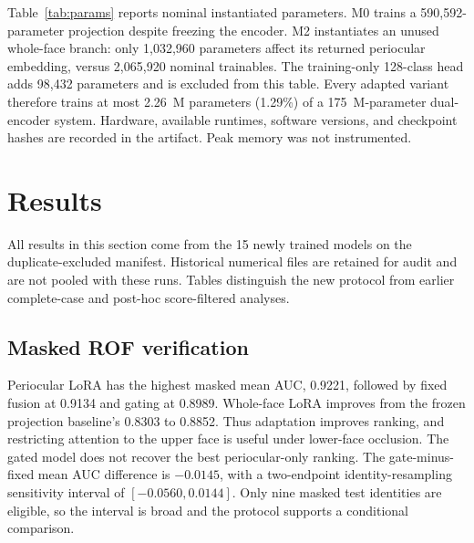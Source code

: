 \documentclass[12pt,a4paper,oneside]{report}
\begin{document}
Table~\ref{tab:params} reports nominal instantiated parameters. M0 trains a 590,592-parameter projection despite freezing the encoder. M2 instantiates an unused whole-face branch: only 1,032,960 parameters affect its returned periocular embedding, versus 2,065,920 nominal trainables. The training-only 128-class head adds 98,432 parameters and is excluded from this table. Every adapted variant therefore trains at most 2.26~M parameters (1.29\%) of a 175~M-parameter dual-encoder system. Hardware, available runtimes, software versions, and checkpoint hashes are recorded in the artifact. Peak memory was not instrumented.


\chapter{Results}
All results in this section come from the 15 newly trained models on the duplicate-excluded manifest. Historical numerical files are retained for audit and are not pooled with these runs. Tables distinguish the new protocol from earlier complete-case and post-hoc score-filtered analyses.

\section{Masked ROF verification}
Periocular LoRA has the highest masked mean AUC, 0.9221, followed by fixed fusion at 0.9134 and gating at 0.8989. Whole-face LoRA improves from the frozen projection baseline's 0.8303 to 0.8852. Thus adaptation improves ranking, and restricting attention to the upper face is useful under lower-face occlusion. The gated model does not recover the best periocular-only ranking. The gate-minus-fixed mean AUC difference is $-0.0145$, with a two-endpoint identity-resampling sensitivity interval of $[-0.0560,0.0144]$. Only nine masked test identities are eligible, so the interval is broad and the protocol supports a conditional comparison.
\end{document}
